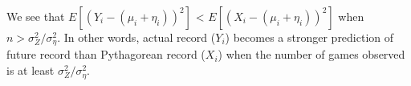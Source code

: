 \documentclass{article}
\begin{document}
      We see that $E[(Y_i - (\mu_i + \eta_i))^2]$ < $E[(X_i - (\mu_i + \eta_i))^2]$ when $n > \sigma^2_Z / \sigma^2_\eta$. In other words, actual record ($Y_i$) becomes a stronger prediction of future record than Pythagorean record ($X_i$) when the number of games observed is at least $\sigma^2_Z / \sigma^2_\eta$.
\end{document}
